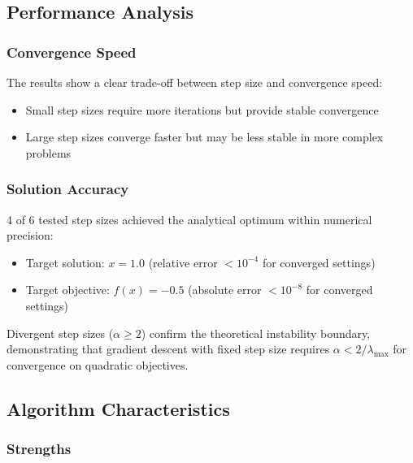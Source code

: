 \documentclass[
]{article}
\providecommand{\tightlist}{%
  \setlength{\itemsep}{0pt}\setlength{\parskip}{0pt}}
\begin{document}
\subsection{Performance Analysis}\label{performance-analysis}

\subsubsection{Convergence Speed}\label{convergence-speed}

The results show a clear trade-off between step size and convergence
speed:

\begin{itemize}
\tightlist
\item
  Small step sizes require more iterations but provide stable
  convergence
\item
  Large step sizes converge faster but may be less stable in more
  complex problems
\end{itemize}

\subsubsection{Solution Accuracy}\label{solution-accuracy}

4 of 6 tested step sizes achieved the analytical optimum within
numerical precision:

\begin{itemize}
\tightlist
\item
  Target solution: \(x = 1.0\) (relative error \(< 10^{-4}\) for
  converged settings)
\item
  Target objective: \(f(x) = -0.5\) (absolute error \(< 10^{-8}\) for
  converged settings)
\end{itemize}

Divergent step sizes (\(\alpha \geq 2\)) confirm the theoretical
instability boundary, demonstrating that gradient descent with fixed
step size requires \(\alpha < 2/\lambda_{\max}\) for convergence on
quadratic objectives.

\subsection{Algorithm Characteristics}\label{algorithm-characteristics}

\subsubsection{Strengths}\label{strengths}
\end{document}

